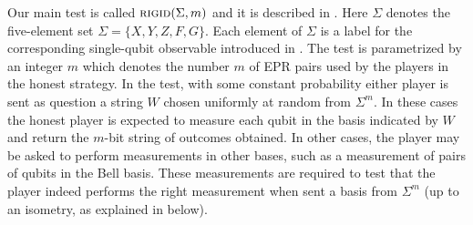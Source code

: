 \documentclass{toc}
\newcommand{\rigid}{\textsc{rigid}}
\begin{document}
Our main test is called $\rigid(\Sigma,m)$ and it is described in . Here $\Sigma$ denotes the five-element set $\Sigma = \{X,Y,Z,F,G\}$. Each element of $\Sigma$ is a label for the corresponding single-qubit observable introduced in . The test is parametrized by an integer $m$ which denotes the number $m$ of EPR pairs used by the players in the honest strategy. In the test, with some constant probability either player is sent as question a string $W$ chosen uniformly at random from $\Sigma^m$. In these cases the honest player is expected to measure each qubit in the basis indicated by $W$ and return the $m$-bit string of outcomes obtained. In other cases, the player may be asked to perform measurements in other bases, such as a measurement of pairs of qubits in the Bell basis. These measurements are required to test that the player indeed performs the right measurement when sent a basis from $\Sigma^m$ (up to an isometry, as explained in  below). 
\end{document}
